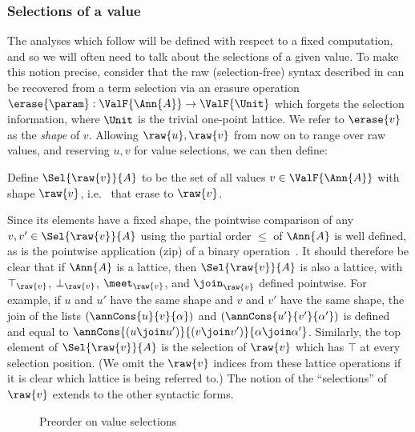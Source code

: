 \subsubsection{Selections of a value}
\label{sec:data-dependencies:selections}

The analyses which follow will be defined with respect to a fixed computation, and so we will often need to talk about the selections of a given value. To make this notion precise, consider that the raw (selection-free) syntax described in  can be recovered from a term selection via an erasure operation $\erase{\param}: \ValF{\Ann{A}} \to \ValF{\Unit}$ which forgets the selection information, where $\Unit$ is the trivial one-point lattice. We refer to $\erase{v}$ as the \emph{shape} of $v$. Allowing $\raw{u}, \raw{v}$ from now on to range over raw values, and reserving $u, v$ for value selections, we can then define:

\begin{definition}
   Define $\Sel{\raw{v}}{A}$ to be the set of all values $v \in \ValF{\Ann{A}}$ with shape $\raw{v}$, i.e.
   ~that erase to $\raw{v}$.
\end{definition}

Since its elements have a fixed shape, the pointwise comparison of any $v, v' \in \Sel{\raw{v}}{A}$ using the partial order $\leq$ of $\Ann{A}$ is well defined, as is the pointwise application (zip) of a binary operation~\cite{gibbons17}. It should therefore be clear that if $\Ann{A}$ is a lattice, then $\Sel{\raw{v}}{A}$ is also a lattice, with $\top_{\raw{v}}$, $\bot_{\raw{v}}$, $\meet_{\raw{v}}$, and $\join_{\raw{v}}$ defined pointwise. For example, if $u$ and $u'$ have the same shape and $v$ and $v'$ have the same shape, the join of the lists $(\annCons{u}{v}{\alpha})$ and $(\annCons{u'}{v'}{\alpha'})$ is defined and equal to $\annCons{(u \join u')}{(v \join v')}{\alpha \join \alpha'}$. Similarly, the top element of $\Sel{\raw{v}}{A}$ is the selection of $\raw{v}$ which has $\top$ at every selection position. (We omit the $\raw{v}$ indices from these lattice operations if it is clear which lattice is being referred to.) The notion of the ``selections'' of $\raw{v}$ extends to the other syntactic forms.

\begin{figure}
   
   \caption{Preorder on value selections}
   \label{fig:data-dependencies:leq}
\end{figure}

